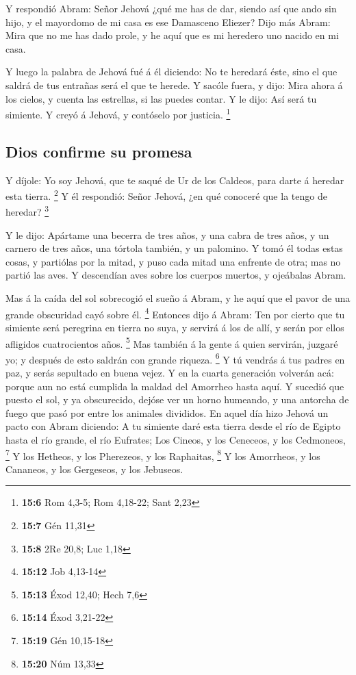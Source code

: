  Y respondió Abram: Señor Jehová ¿qué me has de dar,
siendo así que ando sin hijo, y el mayordomo de mi casa es ese Damasceno
Eliezer?  Dijo más Abram: Mira que no me has dado prole, y
he aquí que es mi heredero uno nacido en mi casa.

 Y luego la palabra de Jehová fué á él diciendo: No te
heredará éste, sino el que saldrá de tus entrañas será el que te herede.
 Y sacóle fuera, y dijo: Mira ahora á los cielos, y cuenta
las estrellas, si las puedes contar. Y le dijo: Así será tu simiente.
 Y creyó á Jehová, y contóselo por justicia. \footnote{\textbf{15:6}
  Rom 4,3-5; Rom 4,18-22; Sant 2,23}

\hypertarget{dios-confirme-su-promesa}{%
\subsection{Dios confirme su promesa}\label{dios-confirme-su-promesa}}

 Y díjole: Yo soy Jehová, que te saqué de Ur de los
Caldeos, para darte á heredar esta tierra. \footnote{\textbf{15:7} Gén
  11,31}  Y él respondió: Señor Jehová, ¿en qué conoceré
que la tengo de heredar? \footnote{\textbf{15:8} 2Re 20,8; Luc 1,18}

 Y le dijo: Apártame una becerra de tres años, y una cabra
de tres años, y un carnero de tres años, una tórtola también, y un
palomino.  Y tomó él todas estas cosas, y partiólas por
la mitad, y puso cada mitad una enfrente de otra; mas no partió las
aves.  Y descendían aves sobre los cuerpos muertos, y
ojeábalas Abram.

 Mas á la caída del sol sobrecogió el sueño á Abram, y he
aquí que el pavor de una grande obscuridad cayó sobre él. \footnote{\textbf{15:12}
  Job 4,13-14}  Entonces dijo á Abram: Ten por cierto que
tu simiente será peregrina en tierra no suya, y servirá á los de allí, y
serán por ellos afligidos cuatrocientos años. \footnote{\textbf{15:13}
  Éxod 12,40; Hech 7,6}  Mas también á la gente á quien
servirán, juzgaré yo; y después de esto saldrán con grande riqueza.
\footnote{\textbf{15:14} Éxod 3,21-22}  Y tú vendrás á
tus padres en paz, y serás sepultado en buena vejez.  Y
en la cuarta generación volverán acá: porque aun no está cumplida la
maldad del Amorrheo hasta aquí.  Y sucedió que puesto el
sol, y ya obscurecido, dejóse ver un horno humeando, y una antorcha de
fuego que pasó por entre los animales divididos.  En
aquel día hizo Jehová un pacto con Abram diciendo: A tu simiente daré
esta tierra desde el río de Egipto hasta el río grande, el río Eufrates;
 Los Cineos, y los Ceneceos, y los Cedmoneos, \footnote{\textbf{15:19}
  Gén 10,15-18}  Y los Hetheos, y los Pherezeos, y los
Raphaitas, \footnote{\textbf{15:20} Núm 13,33}  Y los
Amorrheos, y los Cananeos, y los Gergeseos, y los Jebuseos.

